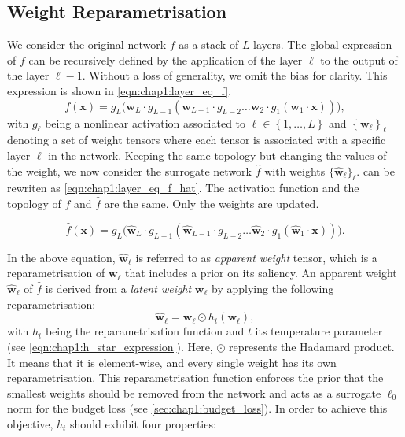 \subsection{Weight Reparametrisation}
\label{sec:chap1:weight_reparam}

We consider the original network $f$ as a stack of $L$ layers. The global
expression of $f$ can be recursively defined by the application of the layer
$\ell$ to the output of the layer $\ell-1$. Without a loss of generality, we
omit the bias for clarity. This expression is shown in
\cref{eqn:chap1:layer_eq_f}.
\begin{equation}
  \label{eqn:chap1:layer_eq_f}
  f(\mathbf{x}) = g_L \big(\mathbf{w}_L \cdot g_{L-1}(\mathbf{w}_{L-1} \cdot g_{L-2} \dots
  \mathbf{w}_2 \cdot g_1(\mathbf{w}_1 \cdot \mathbf{x}))\big),
\end{equation}
\noindent with $g_\ell$ being a nonlinear activation associated to $\ell \in
  \left\{ 1,\dots, L \right\}$ and $\left\{ \mathbf{w}_\ell \right\}_\ell$
denoting a set of weight tensors where each tensor is associated with a specific
layer $\ell$ in the network. Keeping the same topology but changing the values
of the weight, we now consider the surrogate network $\hat{f}$ with weights
$\{\mathbf{\hat{w}}_\ell\}_\ell$.  can be rewriten as
\cref{eqn:chap1:layer_eq_f_hat}. The activation function and the topology of $f$
and $\hat{f}$ are the same. Only the weights are updated.

\begin{equation}
  \label{eqn:chap1:layer_eq_f_hat}
  \hat{f}(\mathbf{x}) = g_L \big(\mathbf{\hat w}_L \cdot g_{L-1}(\mathbf{\hat w}_{L-1} \cdot g_{L-2}
  \dots\mathbf{\hat w}_2 \cdot g_1(\mathbf{\hat w}_1 \cdot \mathbf{x}))\big).
\end{equation}

\noindent In the above equation, $\mathbf{\hat w}_\ell$ is referred to as
\textit{apparent weight} tensor, which is a reparametrisation of
$\mathbf{w}_\ell$ that includes a prior on its saliency. An apparent weight
$\mathbf{\hat w}_\ell$ of $\hat{f}$ is derived from a \emph{latent weight}
$\mathbf{w}_\ell$ by applying the following reparametrisation:
\begin{equation}
  \label{eqn:chap1:reparam}
  \mathbf{\hat w}_\ell = \mathbf{w}_\ell  \odot h_t(\mathbf{w}_\ell),
\end{equation}
\noindent with $h_t$ being the reparametrisation function and $t$ its
temperature parameter (see \cref{eqn:chap1:h_star_expression}). Here, $\odot$
represents the Hadamard product. It means that it is element-wise, and every
single weight has its own reparametrisation. This reparametrisation function
enforces the prior that the smallest weights should be removed from the network
and acts as a surrogate $\ell_0$ norm for the budget loss (see
\cref{sec:chap1:budget_loss}). In order to achieve this objective, $h_t$ should
exhibit four properties: \\

